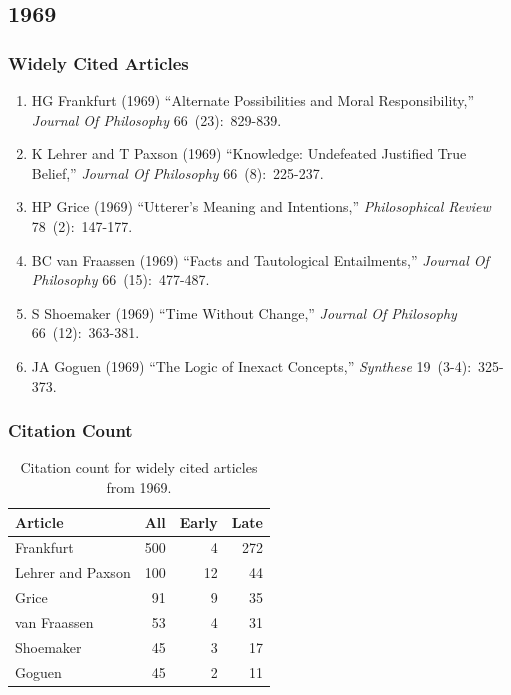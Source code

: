 \documentclass[
  10pt,
  letterpaper,
  DIV=11,
  numbers=noendperiod,
  twoside]{scrartcl}
\providecommand{\tightlist}{%
  \setlength{\itemsep}{0pt}\setlength{\parskip}{0pt}}\usepackage{longtable,booktabs,array}
\begin{document}
\newpage

\subsection{1969}\label{sec-s1969}

\subsubsection*{Widely Cited Articles}\label{widely-cited-articles-13}

\begin{enumerate}
\def\labelenumi{\arabic{enumi}.}
\tightlist
\item
  HG Frankfurt (1969) ``Alternate Possibilities and Moral
  Responsibility,'' \emph{Journal Of Philosophy} 66~(23):~829-839.
\item
  K Lehrer and T Paxson (1969) ``Knowledge: Undefeated Justified True
  Belief,'' \emph{Journal Of Philosophy} 66~(8):~225-237.
\item
  HP Grice (1969) ``Utterer's Meaning and Intentions,''
  \emph{Philosophical Review} 78~(2):~147-177.
\item
  BC van Fraassen (1969) ``Facts and Tautological Entailments,''
  \emph{Journal Of Philosophy} 66~(15):~477-487.
\item
  S Shoemaker (1969) ``Time Without Change,'' \emph{Journal Of
  Philosophy} 66~(12):~363-381.
\item
  JA Goguen (1969) ``The Logic of Inexact Concepts,'' \emph{Synthese}
  19~(3-4):~325-373.
\end{enumerate}

\subsubsection*{Citation Count}\label{sec-count-1969}

\begin{longtable}[]{@{}lrrr@{}}

\caption{\label{tbl-citation-count-1969}Citation count for widely cited
articles from 1969.}

\tabularnewline

\toprule\noalign{}
Article & All & Early & Late \\
\midrule\noalign{}
\endhead
\bottomrule\noalign{}
\endlastfoot
Frankfurt & 500 & 4 & 272 \\
Lehrer and Paxson & 100 & 12 & 44 \\
Grice & 91 & 9 & 35 \\
van Fraassen & 53 & 4 & 31 \\
Shoemaker & 45 & 3 & 17 \\
Goguen & 45 & 2 & 11 \\

\end{longtable}
\end{document}
